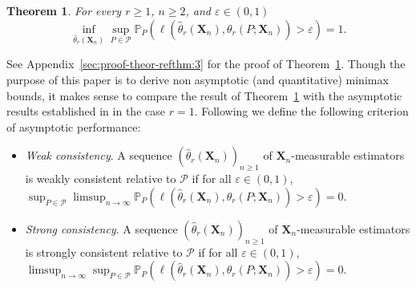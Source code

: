 \documentclass{article}
\newtheorem{theorem}{Theorem}
\newcommand{\1}{\boldsymbol{1}}
\newcommand{\PP}{\mathbb{P}}
\theoremstyle{plain}
\begin{document}
\begin{theorem}
  \label{thm:3}
  For every $r \geq 1$, $n \geq 2$, and $\varepsilon \in (0,1)$
  \begin{equation*}
    \inf_{\hat{\theta}_r(\mathbf{X}_{n})}\sup_{P\in \mathcal{P}}\PP_P\left( \ell(\hat{\theta}_r(\mathbf{X}_{n}),\theta_r(P;\mathbf{X}_{n})) > \varepsilon \right) =1.
  \end{equation*}
\end{theorem}

See Appendix~\ref{sec:proof-theor-refthm:3} for the proof of Theorem~\ref{thm:3}. Though the purpose of this paper is to derive non asymptotic (and quantitative) minimax bounds, it makes sense to compare the result of Theorem~\ref{thm:3} with the asymptotic results established in \cite{Mos(15)} in the case $r=1$. Following \cite{Mos(15)} we define the following criterion of asymptotic performance:
  \begin{itemize}
    \item \textit{Weak consistency}. A sequence $(\hat\theta_r(\mathbf{X}_n))_{n\geq 1}$ of $\bm{X}_n$-measurable estimators is weakly consistent relative to $\mathcal{P}$ if for all $\varepsilon \in (0,1)$, $ \sup_{P\in \mathcal{P}}\limsup_{n\to \infty} \PP_P\left( \ell(\hat{\theta}_r(\mathbf{X}_{n}),\theta_r(P;\mathbf{X}_{n})) >  \varepsilon \right) = 0$.
    \item \textit{Strong consistency}. A sequence $(\hat\theta_r(\mathbf{X}_n))_{n\geq 1}$ of $\bm{X}_n$-measurable estimators is strongly consistent relative to $\mathcal{P}$ if for all $\varepsilon \in (0,1)$, $\limsup_{n\to \infty} \sup_{P\in \mathcal{P}}\PP_P\left( \ell(\hat{\theta}_r(\mathbf{X}_{n}),\theta_r(P;\mathbf{X}_{n})) >   \varepsilon \right) =0$.
  \end{itemize}
\end{document}
